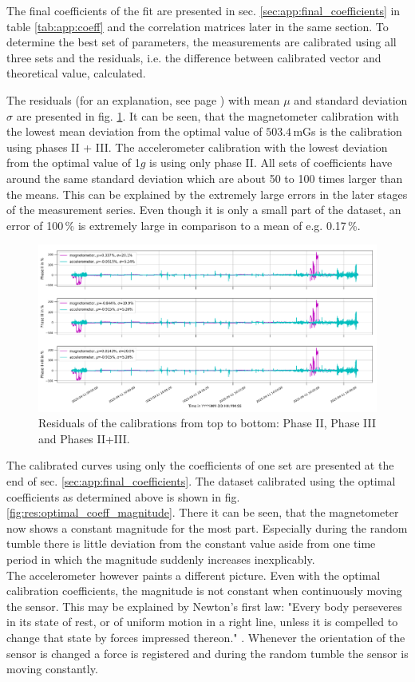 The final coefficients of the fit are presented in sec. \ref{sec:app:final_coefficients} in table \ref{tab:app:coeff} and the correlation matrices later in the same section. To determine the best set of parameters, the measurements are calibrated using all three sets and the residuals, i.e. the difference between calibrated vector and theoretical value, calculated. 

The residuals (for an explanation, see page \pageref{eq:residuals}) with mean $\mu$ and standard deviation $\sigma$ are presented in fig. \ref{fig:res:residuals}. It can be seen, that the magnetometer calibration with the lowest mean deviation from the optimal value of $503.4$\,mGs is the calibration using phases II + III. The accelerometer calibration with the lowest deviation from the optimal value of 1$g$ is using only phase II. All sets of coefficients have around the same standard deviation which are about 50 to 100 times larger than the means. This can be explained by the extremely large errors in the later stages of the measurement series. Even though it is only a small part of the dataset, an error of 100\,\% is extremely large in comparison to a mean of e.g. 0.17\,\%.
\begin{figure}[H]
    \centering
    \includegraphics[width=\linewidth]{images/04_results/residuals_mag_acc_calibrations.png}
    \caption[Residuals of the calibrations.]{Residuals of the calibrations from top to bottom: Phase II, Phase III and Phases II+III.}
    \label{fig:res:residuals}
\end{figure}

The calibrated curves using only the coefficients of one set are presented at the end of sec. \ref{sec:app:final_coefficients}. The dataset calibrated using the optimal coefficients as determined above is shown in fig. \ref{fig:res:optimal_coeff_magnitude}. There it can be seen, that the magnetometer now shows a constant magnitude for the most part. Especially during the random tumble there is little deviation from the constant value aside from one time period in which the magnitude suddenly increases inexplicably.\\
The accelerometer however paints a different picture. Even with the optimal calibration coefficients, the magnitude is not constant when continuously moving the sensor. This may be explained by Newton's first law:
"Every body perseveres in its state of rest, or of uniform motion in a right line, unless it is compelled to change that state by forces impressed thereon." \parencite{newton1846}.
Whenever the orientation of the sensor is changed a force is registered and during the random tumble the sensor is moving constantly.

